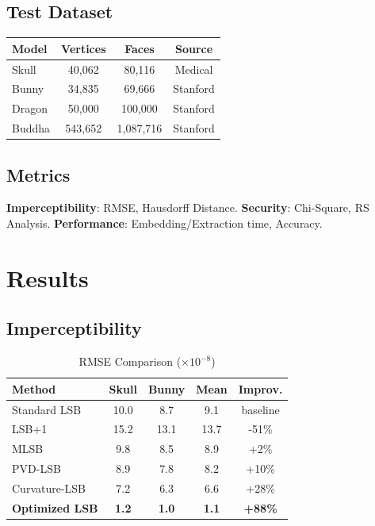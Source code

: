 \documentclass[conference]{IEEEtran}
\begin{document}
\subsection{Test Dataset}
\begin{table}[H]
\centering
\begin{tabular}{lccc}
\toprule
\textbf{Model} & \textbf{Vertices} & \textbf{Faces} & \textbf{Source} \\
\midrule
Skull & 40,062 & 80,116 & Medical \\
Bunny & 34,835 & 69,666 & Stanford \\
Dragon & 50,000 & 100,000 & Stanford \\
Buddha & 543,652 & 1,087,716 & Stanford \\
\bottomrule
\end{tabular}
\end{table}

\subsection{Metrics}
\textbf{Imperceptibility}: RMSE, Hausdorff Distance. \textbf{Security}: Chi-Square, RS Analysis. \textbf{Performance}: Embedding/Extraction time, Accuracy.

\section{Results}

\subsection{Imperceptibility}
\begin{table}[H]
\caption{RMSE Comparison ($\times 10^{-8}$)}
\centering
\begin{tabular}{lcccc}
\toprule
\textbf{Method} & \textbf{Skull} & \textbf{Bunny} & \textbf{Mean} & \textbf{Improv.} \\
\midrule
Standard LSB & 10.0 & 8.7 & 9.1 & baseline \\
LSB+1 & 15.2 & 13.1 & 13.7 & -51\% \\
MLSB & 9.8 & 8.5 & 8.9 & +2\% \\
PVD-LSB & 8.9 & 7.8 & 8.2 & +10\% \\
Curvature-LSB & 7.2 & 6.3 & 6.6 & +28\% \\
\textbf{Optimized LSB} & \textbf{1.2} & \textbf{1.0} & \textbf{1.1} & \textbf{+88\%} \\
\bottomrule
\end{tabular}
\end{table}
\end{document}
